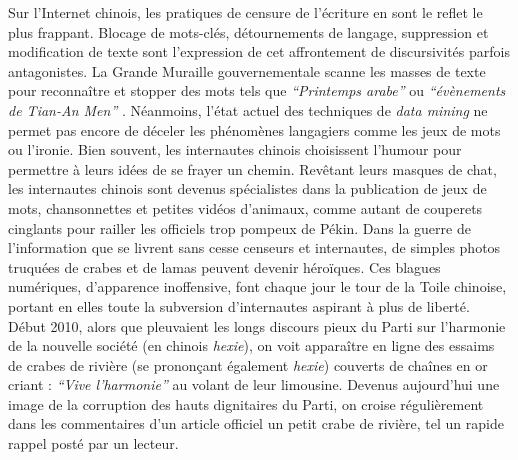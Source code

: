 Sur l’Internet chinois, les pratiques de censure de l’écriture en sont le reflet le plus frappant. Blocage de mots-clés, détournements de langage, suppression et modification de texte sont l’expression de cet affrontement de discursivités parfois antagonistes. La Grande Muraille gouvernementale scanne les masses de texte pour reconnaître et stopper des mots tels que \textit{``Printemps arabe''} ou \textit{``évènements de Tian-An Men''} \citep{MacKinnon2012}. Néanmoins, l’état actuel des techniques de \textit{data mining} ne permet pas encore de déceler les phénomènes langagiers comme les jeux de mots ou l’ironie. Bien souvent, les internautes chinois choisissent l’humour pour permettre à leurs idées de se frayer un chemin. Revêtant leurs masques de chat, les internautes chinois sont devenus spécialistes dans la publication de jeux de mots, chansonnettes et petites vidéos d’animaux, comme autant de couperets cinglants pour railler les officiels trop pompeux de Pékin. Dans la guerre de l’information que se livrent sans cesse censeurs et internautes, de simples photos truquées de crabes et de lamas peuvent devenir héroïques. Ces blagues numériques, d’apparence inoffensive, font chaque jour le tour de la Toile chinoise, portant en elles toute la subversion d’internautes aspirant à plus de liberté. Début 2010, alors que pleuvaient les longs discours pieux du Parti sur l’harmonie de la nouvelle société (en chinois \textit{hexie}), on voit apparaître en ligne des essaims de crabes de rivière (se prononçant également \textit{hexie}) couverts de chaînes en or criant : \textit{“Vive l’harmonie”} au volant de leur limousine. Devenus aujourd’hui une image de la corruption des hauts dignitaires du Parti, on croise régulièrement dans les commentaires d’un article officiel un petit crabe de rivière, tel un rapide rappel posté par un lecteur.


